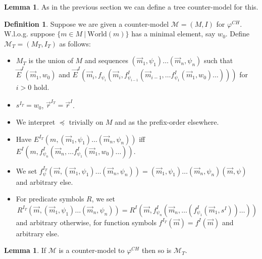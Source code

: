 \documentclass{easychair}
\theoremstyle{definition}
\theoremstyle{definition}
\theoremstyle{definition}
\newtheorem{lemma}[theorem]{Lemma}
\theoremstyle{definition}
\theoremstyle{definition}
\newtheorem{definition}[theorem]{Definition}
\theoremstyle{definition}
\theoremstyle{definition}
\begin{document}
\begin{lemma}
As in the previous section we can define a tree counter-model for this.
\begin{definition}
	Suppose we are given a counter-model $\mathcal M = (M, I)$ for $\varphi^{CH}$. W.l.o.g. suppose $\{m\in M\:|\:\text{World}(m)\}$ has a minimal element, say $w_0$. Define $\mathcal M_T = (M_T, I_T)$ as follows:
	\begin{itemize}
		\item $M_T$ is the union of $M$ and sequences $(\vec m_1, \psi_1)\dots (\vec m_n, \psi_n)$ such that $\vec E^I(\vec m_1, w_0)$ and $\vec E^I(\vec m_i, f_{\psi_i}(\vec m_i, f_{\psi_{i-1}}^I(\vec m_{i-1}, \dots f_{\psi_1}^I(\vec m_1, w_0)\dots)))$ for $i > 0$ hold.
		\item $s^{I_T} = w_0$, $\vec r^{I_T} = \vec r^I$.
		\item We interpret $\preceq$ trivially on $M$ and as the prefix-order elsewhere.
		\item Have $E^{I_T}(m, (\vec m_1, \psi_1)\dots (\vec m_n, \psi_n))$ iff $E^I(m, f_{\psi_n}^I(\vec m_n, \dots f_{\psi_1}^I(\vec m_1, w_0)\dots))$.
		\item We set $f_\psi^{I_T}(\vec m, (\vec m_1, \psi_1)\dots (\vec m_n, \psi_n)) = (\vec m_1, \psi_1)\dots (\vec m_n, \psi_n)(\vec m, \psi)$ and arbitrary else.
		\item For predicate symbols $R$, we set $${R}^{I_T}(\vec m, (\vec m_1, \psi_1)\dots (\vec m_n, \psi_n)) = {R}^I(\vec m, f_{\psi_n}^I(\vec m_n, \dots(f_{\psi_1}^I(\vec m_1, s^I))\dots))$$ and arbitrary otherwise, for function symbols $f^{I_T}(\vec m) = f^I(\vec m)$ and arbitrary else.
	\end{itemize}
\end{definition}

\begin{lemma}
	If $\mathcal M$ is a counter-model to $\varphi^{CH}$ then so is $\mathcal M_T$.
\end{lemma}


\end{lemma}
\end{document}
